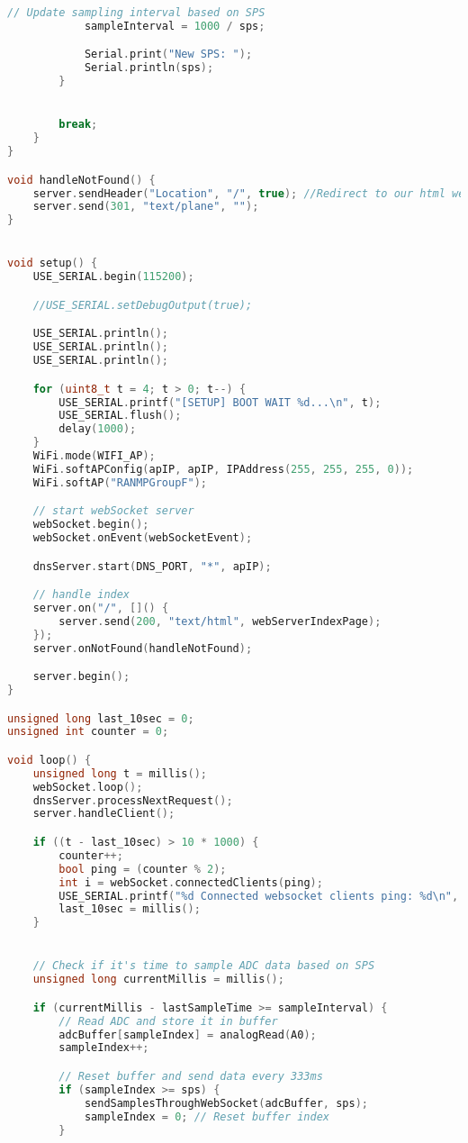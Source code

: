 \begin{lstlisting}[style=htmlcssjs, language=CPP]
            // Update sampling interval based on SPS
            sampleInterval = 1000 / sps;

            Serial.print("New SPS: ");
            Serial.println(sps);
        }


        break;
    }
}

void handleNotFound() {
    server.sendHeader("Location", "/", true); //Redirect to our html web page
    server.send(301, "text/plane", "");
}


void setup() {
    USE_SERIAL.begin(115200);

    //USE_SERIAL.setDebugOutput(true);

    USE_SERIAL.println();
    USE_SERIAL.println();
    USE_SERIAL.println();

    for (uint8_t t = 4; t > 0; t--) {
        USE_SERIAL.printf("[SETUP] BOOT WAIT %d...\n", t);
        USE_SERIAL.flush();
        delay(1000);
    }
    WiFi.mode(WIFI_AP);
    WiFi.softAPConfig(apIP, apIP, IPAddress(255, 255, 255, 0));
    WiFi.softAP("RANMPGroupF");

    // start webSocket server
    webSocket.begin();
    webSocket.onEvent(webSocketEvent);

    dnsServer.start(DNS_PORT, "*", apIP);

    // handle index
    server.on("/", []() {
        server.send(200, "text/html", webServerIndexPage);
    });
    server.onNotFound(handleNotFound);

    server.begin();
}

unsigned long last_10sec = 0;
unsigned int counter = 0;

void loop() {
    unsigned long t = millis();
    webSocket.loop();
    dnsServer.processNextRequest();
    server.handleClient();

    if ((t - last_10sec) > 10 * 1000) {
        counter++;
        bool ping = (counter % 2);
        int i = webSocket.connectedClients(ping);
        USE_SERIAL.printf("%d Connected websocket clients ping: %d\n", i, ping);
        last_10sec = millis();
    }


    // Check if it's time to sample ADC data based on SPS
    unsigned long currentMillis = millis();

    if (currentMillis - lastSampleTime >= sampleInterval) {
        // Read ADC and store it in buffer
        adcBuffer[sampleIndex] = analogRead(A0);
        sampleIndex++;

        // Reset buffer and send data every 333ms
        if (sampleIndex >= sps) {
            sendSamplesThroughWebSocket(adcBuffer, sps);
            sampleIndex = 0; // Reset buffer index
        }


\end{lstlisting}
